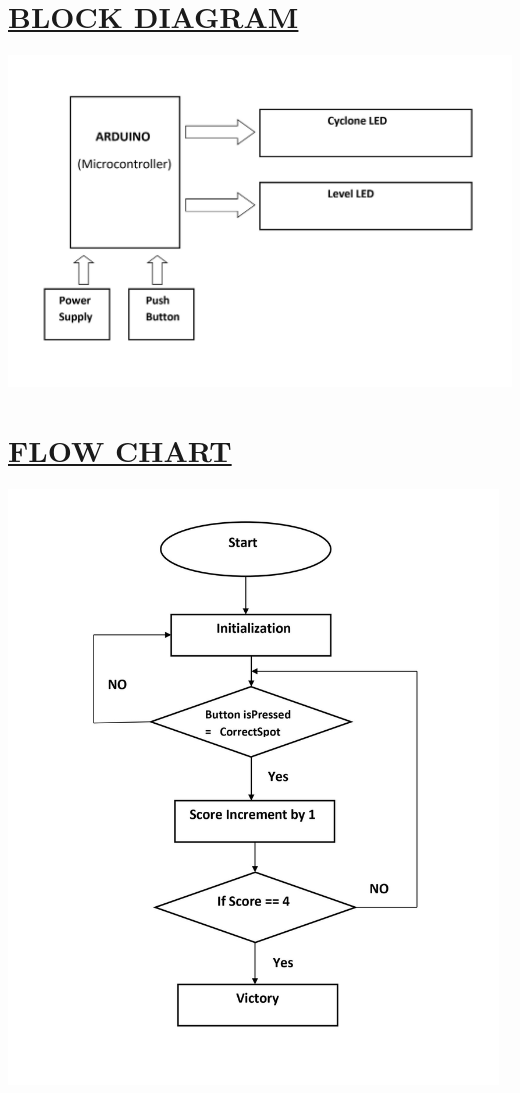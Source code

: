 \documentclass[12pt]{article}
\begin{document}
\section*{\underline{BLOCK DIAGRAM}}
\includegraphics[width=15cm]{block.jpg}
\section*{\underline{FLOW CHART}}
\includegraphics[width=13cm]{flow.jpg}
\end{document}
